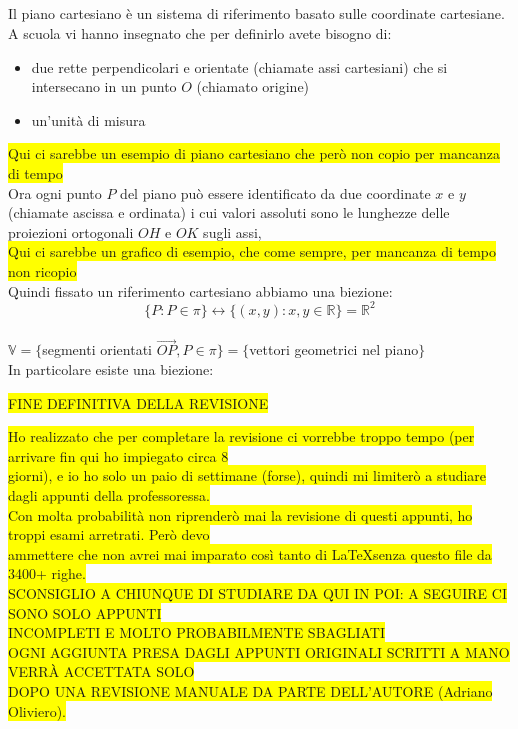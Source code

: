 \documentclass{article}
\newcommand{\hl}[1]{\colorbox{yellow}{#1}}
\newcommand{\R}{\mathbb{R}}
\newcommand{\V}{\mathbb{V}}
\newcommand{\colort}[2]{\text{\color{#1}#2}}
\begin{document}
	\subsection{\colort{violet}{Piano Cartesiano}}
	Il piano cartesiano è un sistema di riferimento basato sulle coordinate cartesiane.\\
	A scuola vi hanno insegnato che per definirlo avete bisogno di:
	\begin{itemize}
		\item due rette perpendicolari e orientate (chiamate assi cartesiani) che si intersecano in un punto $O$ (chiamato origine)
		\item un'unità di misura
	\end{itemize}
	\hl{Qui ci sarebbe un esempio di piano cartesiano che però non copio per mancanza di tempo}\\
	Ora ogni punto $P$ del piano può essere identificato da due coordinate $x$ e $y$ (chiamate ascissa e ordinata) i cui valori assoluti sono le lunghezze delle proiezioni ortogonali $OH$ e $OK$ sugli assi,\\
	\hl{Qui ci sarebbe un grafico di esempio, che come sempre, per mancanza di tempo non ricopio}\\
	Quindi fissato un riferimento cartesiano abbiamo una biezione:
	$$\{P:P\in\pi\}\leftrightarrow\{(x,y):x,y\in\R\}=\R^2$$\\
$\V=\{$segmenti orientati $\overrightarrow{OP},P\in\pi\}=\{$vettori geometrici nel piano$\}$\\
	In particolare esiste una biezione:\\
	\begin{center}\hl{FINE DEFINITIVA DELLA REVISIONE}\end{center}
	\hl{Ho realizzato che per completare la revisione ci vorrebbe troppo tempo (per arrivare fin qui ho impiegato circa 8}\\
	\hl{giorni), e io ho solo un paio di settimane (forse), quindi mi limiterò a studiare dagli appunti della professoressa.}\\
	\hl{Con molta probabilità non riprenderò mai la revisione di questi appunti, ho troppi esami arretrati. Però devo}\\
	\hl{ammettere che non avrei mai imparato così tanto di \LaTeX senza questo file da 3400+ righe.}\\
	\hl{SCONSIGLIO A CHIUNQUE DI STUDIARE DA QUI IN POI: A SEGUIRE CI SONO SOLO APPUNTI}\\
	\hl{INCOMPLETI E MOLTO PROBABILMENTE SBAGLIATI}\\
	\hl{OGNI AGGIUNTA PRESA DAGLI APPUNTI ORIGINALI SCRITTI A MANO VERRÀ ACCETTATA SOLO}\\
	\hl{DOPO UNA REVISIONE MANUALE DA PARTE DELL'AUTORE (Adriano Oliviero).}
\end{document}

